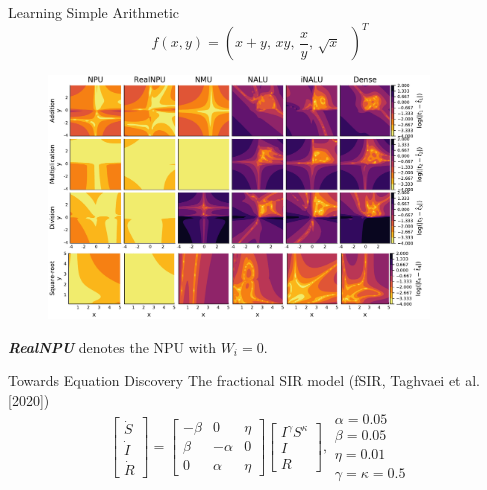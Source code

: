 \documentclass{beamer}
\begin{document}
\begin{frame}{Learning Simple Arithmetic}
  \vspace{-0.5cm}
  \begin{equation*}
    f(x,y) = (x+y,\, xy,\, \frac{x}{y},\, \sqrt{x} \text{  })^T 
  \end{equation*}
  \begin{figure}
    \centering
    \includegraphics[width=0.9\textwidth]{../plots/simple_err.pdf}
  \end{figure}
  \vspace{-0.6cm}
  \hspace{1cm}
  {\tiny \emph{\bf RealNPU} denotes the NPU with $W_i=0$.
  }
\end{frame}

\begin{frame}{Towards Equation Discovery}
  \centering
  The fractional SIR model (fSIR, Taghvaei et al. [2020])
  \begin{equation*}
    \begin{bmatrix}
      \dot S \\ \dot I \\ \dot R
    \end{bmatrix}
    =
    \begin{bmatrix}
      -\beta & 0 & \eta \\
      \beta & -\alpha & 0 \\
      0 & \alpha & \eta
    \end{bmatrix}
    \begin{bmatrix}
      I^\gamma S^\kappa \\ I \\ R
    \end{bmatrix},
    \begin{matrix}
      \alpha=0.05 \\ \beta=0.05 \\ \eta=0.01 \\ \gamma=\kappa=0.5
    \end{matrix}
  \end{equation*}
  \resizebox{.6\textwidth}{!}{}
\end{frame}
\end{document}

